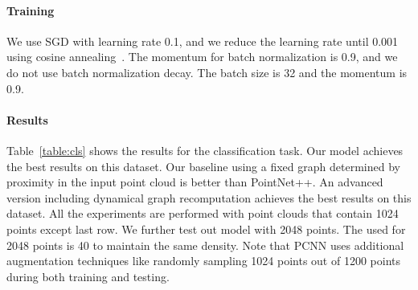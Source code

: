 \documentclass[acmtog]{acmart}
\begin{document}
\paragraph{Training}
We use SGD with learning rate 0.1, and we reduce the learning rate until 0.001 using cosine annealing~\cite{sgdr}. The momentum for batch normalization is 0.9, and we do not use batch normalization decay. The batch size is 32 and the momentum is 0.9.


\paragraph{Results}
Table~\ref{table:cls} shows the results for the classification task. Our model achieves the best results on this dataset. Our baseline using a fixed graph determined by proximity in the input point cloud is  better than PointNet++. An advanced version including dynamical graph recomputation achieves the best results on this dataset. All the experiments are performed with point clouds that contain 1024 points except last row. We further test out model with 2048 points. The  used for 2048 points is 40 to maintain the same density. Note that PCNN \cite{pcnn2018} uses additional augmentation techniques like randomly sampling 1024 points out of 1200 points during both training and testing.
\end{document}
